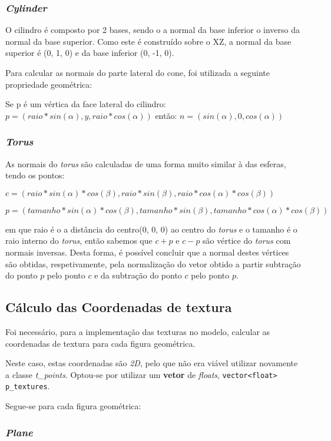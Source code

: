 \documentclass[relatorio.tex]{subfiles}
\begin{document}
\subsubsection{\textit{Cylinder}}
O cilindro é composto por 2 bases, sendo o a normal da base inferior o inverso
da normal da base superior. Como este é construído sobre o XZ, a normal da base superior
é (0, 1, 0) e da base inferior (0, -1, 0).

Para calcular as normais do parte lateral do cone, foi utilizada a seguinte propriedade
geométrica:

Se p é um vértica da face lateral do cilindro:
$ p = (raio * sin(\alpha), y, raio * cos(\alpha))$
então:
$ n = (sin(\alpha), 0, cos(\alpha))$

\subsubsection{\textit{Torus}}
As normais do \textit{torus} são calculadas de uma forma muito similar à das esferas,
tendo os pontos:

$ c = (raio * sin(\alpha) * cos(\beta), raio * sin(\beta), raio * cos(\alpha) * cos(\beta))$

$ p = (tamanho * sin(\alpha) * cos(\beta), tamanho * sin(\beta), tamanho * cos(\alpha) * cos(\beta))$

em que raio é o a distância do centro(0, 0, 0) ao centro do \textit{torus} e o tamanho é o raio interno
do \textit{torus}, então sabemos que $c + p$ e $c - p$ são vértice do \textit{torus} com normais inversas. 
Desta forma, é possível concluir que a normal destes vértices são obtidas, respetivamente, pela normalização 
do vetor obtido a partir subtração do ponto $p$ pelo ponto $c$ e da subtração do ponto $c$ pelo ponto $p$.

\subsection{Cálculo das Coordenadas de textura} \label{subsec:texCoord}
Foi necessário, para a implementação das texturas no modelo,
calcular as coordenadas de textura para cada figura geométrica.

Neste caso, estas coordenadas são \textit{2D}, pelo que
não era viável utilizar novamente a classe \textit{t\_points}.
Optou-se por utilizar um \textbf{vetor} de \textit{floats},
\texttt{vector<float> p_textures}.

Segue-se para cada figura geométrica:
\subsubsection{\textit{Plane}}
\end{document}
